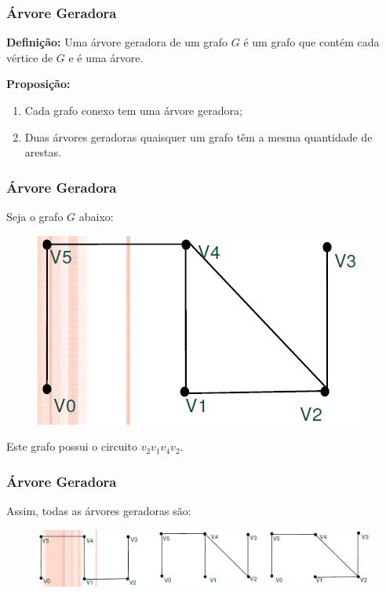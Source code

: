 \documentclass[hyperref={pdfpagelabels=false}]{beamer}
\begin{document}
\begin{frame}
\frametitle{Árvore Geradora}
{\bf Definição:} Uma árvore geradora de um grafo $G$ é um grafo que contém cada vértice de $G$ e é uma árvore.

\pause

{\bf Proposição:} \begin{enumerate}
	\item Cada grafo conexo tem uma árvore geradora;
	\item Duas árvores geradoras quaisquer um grafo têm a mesma quantidade de arestas.
\end{enumerate}

\end{frame}

\begin{frame}
\frametitle{Árvore Geradora}

Seja o grafo $G$ abaixo:

\begin{figure}[!h]
	\centering
	\includegraphics[scale=0.4]{02}
	\label{02}
\end{figure}

Este grafo possui o circuito $v_2 v_1 v_4 v_2$.

\end{frame}

\begin{frame}
\frametitle{Árvore Geradora}

Assim, todas as árvores geradoras são:

\begin{figure}[!h]
	\centering
	\includegraphics[scale=0.4]{03}
	\label{03}
\end{figure}

\end{frame}
\end{document}
